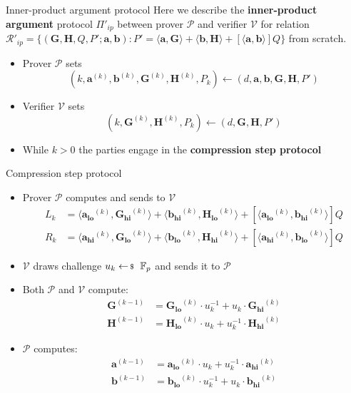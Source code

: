 \documentclass{zkdl-presentation-template}
\begin{document}
    \begin{frame}{Inner-product argument protocol}
        Here we describe the \textbf{inner-product argument} protocol $\Pi'_{ip}$ between prover $\mathcal{P}$ and verifier $\mathcal{V}$ for relation $\mathcal{R}'_{ip} = \{ (\mathbf{G,H}, Q, P'; \mathbf{a,b}) : P' = \langle \mathbf{a,G} \rangle + \langle \mathbf{b,H} \rangle + [\langle \mathbf{a,b} \rangle]Q \}$ from scratch.
        \begin{itemize}
            \item Prover $\mathcal{P}$ sets $$(k, \mathbf{a}^{(k)}, \mathbf{b}^{(k)}, \mathbf{G}^{(k)}, \mathbf{H}^{(k)}, P_k) \gets (d, \mathbf{a,b,G,H},P')$$\pause
            \item Verifier $\mathcal{V}$ sets $$(k, \mathbf{G}^{(k)}, \mathbf{H}^{(k)}, P_k) \gets (d, \mathbf{G,H},P')$$\pause
            \item While $k > 0$ the parties engage in the \textbf{compression step protocol}
        \end{itemize}
    \end{frame}

    \begin{frame}{Compression step protocol}
        \begin{itemize}
            \item Prover $\mathcal{P}$ computes and sends to $\mathcal{V}$
                \begin{align*}
                    L_{k} &= \langle \mathbf{a_{lo}}^{(k)}, \mathbf{G_{hi}}^{(k)}\rangle + \langle \mathbf{b_{hi}}^{(k)}, \mathbf{H_{lo}}^{(k)}\rangle + [\langle \mathbf{a_{lo}}^{(k)}, \mathbf{b_{hi}}^{(k)}\rangle]Q \\
                    R_{k} &= \langle \mathbf{a_{hi}}^{(k)}, \mathbf{G_{lo}}^{(k)}\rangle + \langle \mathbf{b_{lo}}^{(k)}, \mathbf{H_{hi}}^{(k)}\rangle + [\langle \mathbf{a_{hi}}^{(k)}, \mathbf{b_{lo}}^{(k)}\rangle]Q
                \end{align*}
                \pause
            \item $\mathcal{V}$ draws challenge $u_k \leftarrowS \mathbb{F}_p$ and sends it to $\mathcal{P}$\pause
            \item Both $\mathcal{P}$ and $\mathcal{V}$ compute:
                \begin{align*}
                    \mathbf{G}^{(k-1)} &= \mathbf{G_{lo}}^{(k)} \cdot u_k^{-1} + u_k \cdot \mathbf{G_{hi}}^{(k)} \\
                    \mathbf{H}^{(k-1)} &= \mathbf{H_{lo}}^{(k)} \cdot u_k + u_k^{-1} \cdot \mathbf{H_{hi}}^{(k)}
                \end{align*}
                \pause
            \item $\mathcal{P}$ computes:
                \begin{align*}
                    \mathbf{a}^{(k-1)} &= \mathbf{a_{lo}}^{(k)} \cdot u_k + u_k^{-1} \cdot \mathbf{a_{hi}}^{(k)} \\
                    \mathbf{b}^{(k-1)} &= \mathbf{b_{lo}}^{(k)} \cdot u_k^{-1} + u_k \cdot \mathbf{b_{hi}}^{(k)}
                \end{align*}
        \end{itemize}
    \end{frame}
\end{document}
